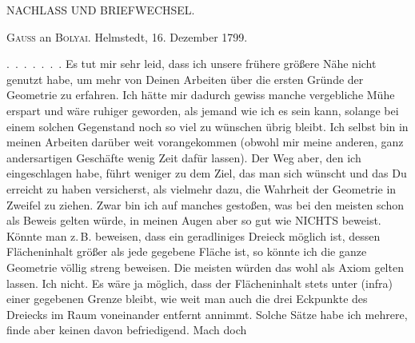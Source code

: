 \begin{center}
{\large NACHLASS UND BRIEFWECHSEL.\par}
\end{center}

\bigskip
\begin{center}\textsc{Gauss} an \textsc{Bolyai}. Helmstedt, 16. Dezember 1799.\end{center}

\medskip
.\, .\, .\, .\, .\, .\, . Es tut mir sehr leid, dass ich unsere frühere größere Nähe nicht genutzt habe, um mehr von Deinen Arbeiten über die ersten Gründe der Geometrie zu erfahren. Ich hätte mir dadurch gewiss manche vergebliche Mühe erspart und wäre ruhiger geworden, als jemand wie ich es sein kann, solange bei einem solchen Gegenstand noch so viel zu wünschen übrig bleibt. Ich selbst bin in meinen Arbeiten darüber weit vorangekommen (obwohl mir meine anderen, ganz andersartigen Geschäfte wenig Zeit dafür lassen). Der Weg aber, den ich eingeschlagen habe, führt weniger zu dem Ziel, das man sich wünscht und das Du erreicht zu haben versicherst, als vielmehr dazu, die Wahrheit der Geometrie in Zweifel zu ziehen. Zwar bin ich auf manches gestoßen, was bei den meisten schon als Beweis gelten würde, in meinen Augen aber so gut wie NICHTS beweist. Könnte man z.\,B. beweisen, dass ein geradliniges Dreieck möglich ist, dessen Flächeninhalt größer als jede gegebene Fläche ist, so könnte ich die ganze Geometrie völlig streng beweisen. Die meisten würden das wohl als Axiom gelten lassen. Ich nicht. Es wäre ja möglich, dass der Flächeninhalt stets unter (infra) einer gegebenen Grenze bleibt, wie weit man auch die drei Eckpunkte des Dreiecks im Raum voneinander entfernt annimmt. Solche Sätze habe ich mehrere, finde aber keinen davon befriedigend. Mach doch
